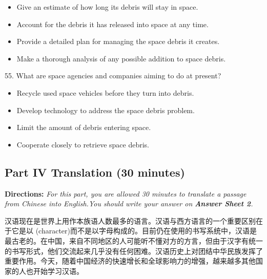 \documentclass[UTF8,11pt]{ctexart}
\begin{document}
\begin{itemize}[leftmargin=2em,itemsep=.2em,topsep=.4em]\item[A.] Give an estimate of how long its debris will stay in space.
\item[B.] Account for the debris it has released into space at any time.
\item[C.] Provide a detailed plan for managing the space debris it creates.
\item[D.] Make a thorough analysis of any possible addition to space debris.
\end{itemize}

55. What are space agencies and companies aiming to do at present?


\begin{itemize}[leftmargin=2em,itemsep=.2em,topsep=.4em]\item[A.] Recycle used space vehicles before they turn into debris.
\item[B.] Develop technology to address the space debris problem.
\item[C.] Limit the amount of debris entering space.
\item[D.] Cooperate closely to retrieve space debris.
\end{itemize}

\subsection*{\textbf{Part} IV \textbf{Translation} \textbf{(30 minutes)}}


\textbf{Directions:}\textit{ For this part, you are allowed 30 minutes to translate a passage from Chinese into English.You should} \textit{write your answer on}\textbf{\textit{ Answer Sheet 2}}\textit{.}


汉语现在是世界上用作本族语人数最多的语言。汉语与西方语言的一个重要区别在于它是以 (character)而不是以字母构成的。目前仍在使用的书写系统中，汉语是最古老的。在中国，来自不同地区的人可能听不懂对方的方言，但由于汉字有统一的书写形式，他们交流起来几乎没有任何困难。汉语历史上对团结中华民族发挥了重要作用。今天，随着中国经济的快速增长和全球影响力的增强，越来越多其他国家的人也开始学习汉语。
\end{document}
